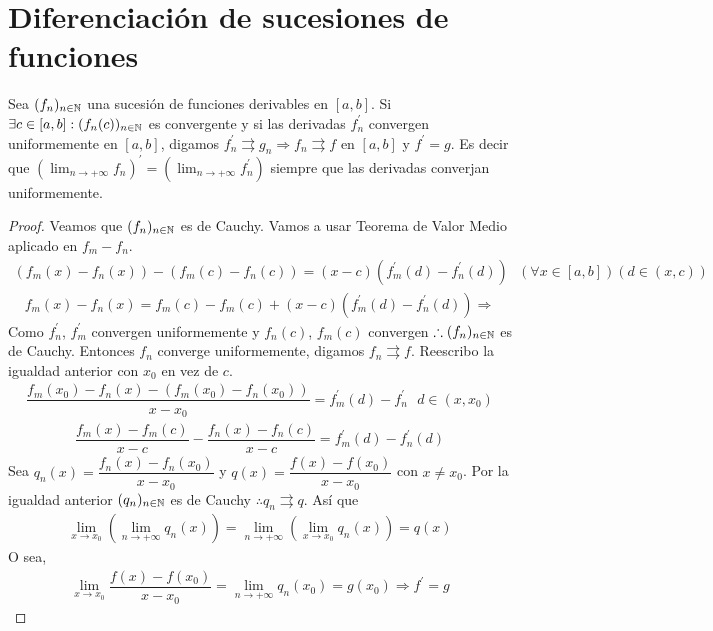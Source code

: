 \section{Diferenciación de sucesiones de funciones}

\begin{theorem}
  Sea \((f_n)_{n \in \mathbb{N}}\) una sucesión de funciones derivables en \([a, b]\). Si \(\exists c \in [a, b] : (f_n(c))_{n \in \mathbb{N}}\) es convergente y si las derivadas \(f_n^{\prime}\) convergen uniformemente en \([a, b]\), digamos \(f_n^{\prime} \rightrightarrows g_n \Rightarrow f_n \rightrightarrows f\) en \([a, b]\) y \(f^{\prime} = g\).
  Es decir que \((\lim_{n \to +\infty} f_n)^{\prime} = (\lim_{n \to +\infty} f_n^{\prime})\) siempre que las derivadas converjan uniformemente.
  \begin{proof}
    Veamos que \((f_n)_{n \in \mathbb{N}}\) es de Cauchy. Vamos a usar Teorema de Valor Medio aplicado en \(f_m - f_n\). \begin{align*}
      (f_m(x) - f_n(x)) - (f_m(c) - f_n(c)) = (x-c)(f_m^{\prime}(d) - f_n^{\prime}(d)) \text{  } (\forall x \in [a, b])(d \in (x, c))
    \end{align*}
    \begin{align*}
      f_m(x) - f_n(x) = f_m(c) - f_m(c) + (x-c) (f_m^{\prime}(d) - f_n^{\prime}(d)) \Rightarrow
    \end{align*} Como \(f_n^{\prime}\), \(f_m^{\prime}\) convergen uniformemente y \(f_n(c)\), \(f_m(c)\) convergen \(\therefore (f_n)_{n \in \mathbb{N}}\) es de Cauchy. Entonces \(f_n\) converge uniformemente, digamos \(f_n \rightrightarrows f\). Reescribo la igualdad anterior con \(x_0\) en vez de \(c\).
    \begin{align*}
      \dfrac{f_m(x_0) - f_n(x) - (f_m(x_0) - f_n(x_0))}{x - x_0} = f_m^{\prime}(d) - f_n^{\prime} \text{  } d \in (x, x_0)
    \end{align*}
    \begin{align*}
      \dfrac{f_m(x) - f_m(c)}{x - c} - \dfrac{f_n(x) - f_n(c)}{x - c} = f_m^{\prime}(d) - f_n^{\prime}(d)
    \end{align*}
    Sea \(q_n(x) = \dfrac{f_n(x)-f_n(x_0)}{x-x_0}\) y \(q(x) = \dfrac{f(x)-f(x_0)}{x - x_0}\) con \(x \neq x_0\). Por la igualdad anterior \((q_n)_{n \in \mathbb{N}}\) es de Cauchy \(\therefore q_n \rightrightarrows q\). Así que \begin{align*}
      \lim_{x \to x_0} (\lim_{n \to +\infty} q_n(x)) = \lim_{n \to +\infty}(\lim_{x \to x_0} q_n(x)) = q(x)
    \end{align*} O sea, \begin{align*}
      \lim_{x \to x_0} \dfrac{f(x) - f(x_0)}{x-x_0} = \lim_{n \to +\infty} q_n(x_0) = g(x_0) \Rightarrow f^{\prime} = g
    \end{align*}
  \end{proof}
\end{theorem}

